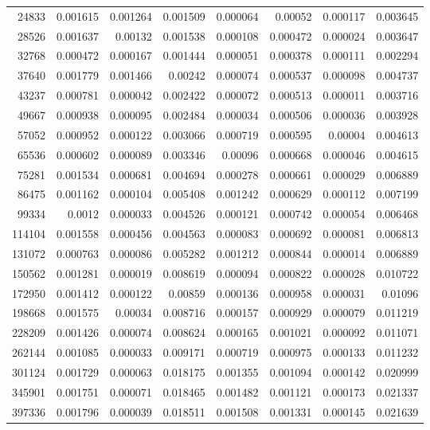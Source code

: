 \begin{longtable}{r r r r r r r r}
24833 & 0.001615 & 0.001264 & 0.001509 & 0.000064 & 0.00052 & 0.000117 & 0.003645 \\
28526 & 0.001637 & 0.00132 & 0.001538 & 0.000108 & 0.000472 & 0.000024 & 0.003647 \\
32768 & 0.000472 & 0.000167 & 0.001444 & 0.000051 & 0.000378 & 0.000111 & 0.002294 \\
37640 & 0.001779 & 0.001466 & 0.00242 & 0.000074 & 0.000537 & 0.000098 & 0.004737 \\
43237 & 0.000781 & 0.000042 & 0.002422 & 0.000072 & 0.000513 & 0.000011 & 0.003716 \\
49667 & 0.000938 & 0.000095 & 0.002484 & 0.000034 & 0.000506 & 0.000036 & 0.003928 \\
57052 & 0.000952 & 0.000122 & 0.003066 & 0.000719 & 0.000595 & 0.00004 & 0.004613 \\
65536 & 0.000602 & 0.000089 & 0.003346 & 0.00096 & 0.000668 & 0.000046 & 0.004615 \\
75281 & 0.001534 & 0.000681 & 0.004694 & 0.000278 & 0.000661 & 0.000029 & 0.006889 \\
86475 & 0.001162 & 0.000104 & 0.005408 & 0.001242 & 0.000629 & 0.000112 & 0.007199 \\
99334 & 0.0012 & 0.000033 & 0.004526 & 0.000121 & 0.000742 & 0.000054 & 0.006468 \\
114104 & 0.001558 & 0.000456 & 0.004563 & 0.000083 & 0.000692 & 0.000081 & 0.006813 \\
131072 & 0.000763 & 0.000086 & 0.005282 & 0.001212 & 0.000844 & 0.000014 & 0.006889 \\
150562 & 0.001281 & 0.000019 & 0.008619 & 0.000094 & 0.000822 & 0.000028 & 0.010722 \\
172950 & 0.001412 & 0.000122 & 0.00859 & 0.000136 & 0.000958 & 0.000031 & 0.01096 \\
198668 & 0.001575 & 0.00034 & 0.008716 & 0.000157 & 0.000929 & 0.000079 & 0.011219 \\
228209 & 0.001426 & 0.000074 & 0.008624 & 0.000165 & 0.001021 & 0.000092 & 0.011071 \\
262144 & 0.001085 & 0.000033 & 0.009171 & 0.000719 & 0.000975 & 0.000133 & 0.011232 \\
301124 & 0.001729 & 0.000063 & 0.018175 & 0.001355 & 0.001094 & 0.000142 & 0.020999 \\
345901 & 0.001751 & 0.000071 & 0.018465 & 0.001482 & 0.001121 & 0.000173 & 0.021337 \\
397336 & 0.001796 & 0.000039 & 0.018511 & 0.001508 & 0.001331 & 0.000145 & 0.021639 \\

\end{longtable}

